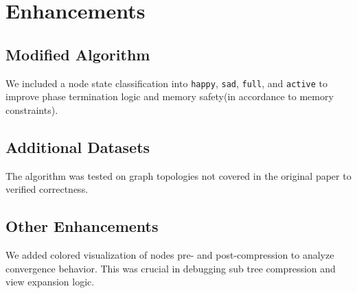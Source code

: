 \documentclass[12pt]{article}
\begin{document}
\section*{Enhancements}
\subsection*{Modified Algorithm}
We included a node state classification into \texttt{happy}, \texttt{sad}, \texttt{full}, and \texttt{active} to improve phase termination logic and memory safety(in accordance to memory constraints).

\subsection*{Additional Datasets}
The algorithm was tested on graph topologies not covered in the original paper to verified correctness.

\subsection*{Other Enhancements}
We added colored visualization of nodes pre- and post-compression to analyze convergence behavior. This was crucial in debugging sub tree compression and view expansion logic.
\end{document}
